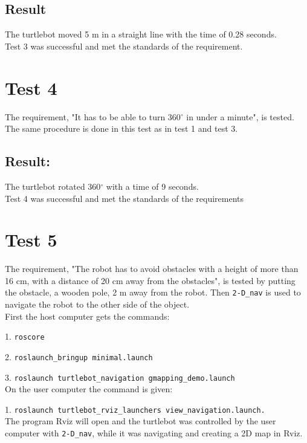\subsection{Result}
The turtlebot moved 5 m in a straight line with the time of 0.28 seconds.\\
Test 3 was successful and met the standards of the requirement. 

%
%
%
%

\section{Test 4}
The requirement, "It has to be able to turn 360${^\circ}$ in under a minute", is tested.\\ 
The same procedure is done in this test as in test 1 and test 3.

\subsection{Result:}
The turtlebot rotated 360${^\circ}$ with a time of 9 seconds.\\
Test 4 was successful and met the standards of the requirements

%
%
%
%

\section{Test 5}
The requirement, "The robot has to avoid obstacles with a height of more than 16 cm, with a distance of 20 cm away from the obstacles", is tested by putting the obstacle, a wooden pole, 2 m away from the robot. Then \texttt{2-D\_nav} is used to navigate the robot to the other side of the object.\\ 
\newline
First the host computer gets the commands:

1. \texttt{roscore}

2. \texttt{roslaunch\_bringup minimal.launch}

3. \texttt{roslaunch turtlebot\_navigation gmapping\_demo.launch}\\
On the user computer the command is given:

1. \texttt{roslaunch turtlebot\_rviz\_launchers view\_navigation.launch.}\\
The program Rviz will open and the turtlebot was controlled by the user computer with \texttt{2-D\_nav}, while it was navigating and creating a 2D map in Rviz.

